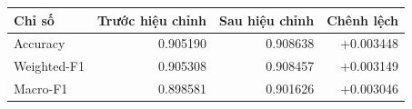 \begin{tabularx}{\textwidth}{Xrrr}\toprule
Chỉ số & Trước hiệu chỉnh & Sau hiệu chỉnh & Chênh lệch\\\midrule
Accuracy & 0.905190 & 0.908638 & +0.003448\\
Weighted-F1 & 0.905308 & 0.908457 & +0.003149\\
Macro-F1 & 0.898581 & 0.901626 & +0.003046\\
\bottomrule\end{tabularx}
